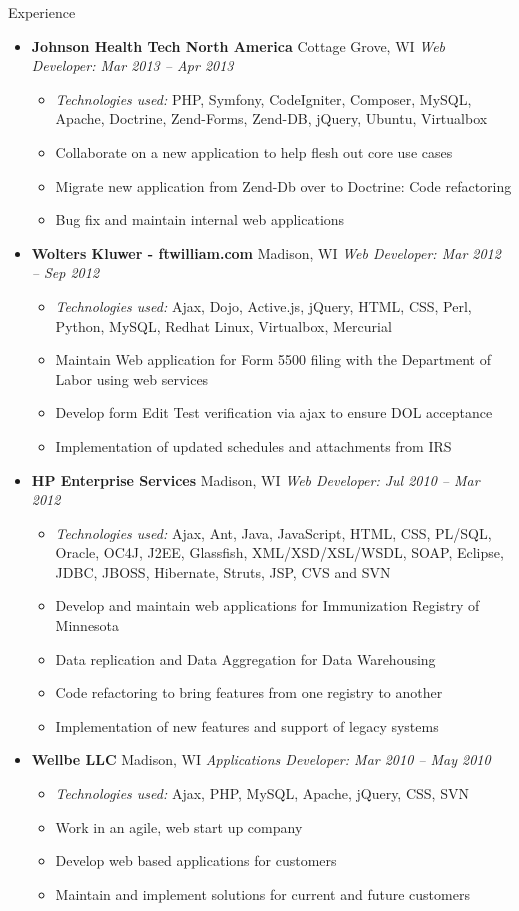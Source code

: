\documentclass[11pt,oneside]{article}
\newenvironment{ressection}[1]{
    \vspace{4pt}
    {\fontfamily{phv}\selectfont\Large#1}
    \begin{itemize}
    \vspace{3pt}
}{
    \end{itemize}
}
\newcommand{\ressubitem}[1]{
    \vspace{-1pt}
    \item \begin{flushleft} #1 \end{flushleft}
}
\newcommand{\resbigitem}[3]{
    \vspace{-5pt}
    \item
    \textbf{#1} #2 \textit{#3}
}
\newenvironment{ressubsec}[3]{
    \resbigitem{#1}{#2}{#3}
    \vspace{-2pt}
    \begin{itemize}
}{
    \end{itemize}
}
\begin{document}
\begin{ressection}{Experience}
    \begin{ressubsec}{Johnson Health Tech North America}{Cottage Grove, WI}{Web Developer: Mar 2013 -- Apr 2013}
        \ressubitem{\textit{Technologies used:} PHP, Symfony, CodeIgniter, Composer, MySQL, Apache, Doctrine, Zend-Forms, Zend-DB, jQuery, Ubuntu, Virtualbox }
        \ressubitem{Collaborate on a new application to help flesh out core use cases }
        \ressubitem{Migrate new application from Zend-Db over to Doctrine: Code refactoring}
        \ressubitem{Bug fix and maintain internal web applications}
    \end{ressubsec}

    \begin{ressubsec}{Wolters Kluwer - ftwilliam.com}{Madison, WI}{Web Developer: Mar 2012 -- Sep 2012}
        \ressubitem{\textit{Technologies used:} Ajax, Dojo, Active.js, jQuery, HTML, CSS, Perl, Python, MySQL, Redhat Linux, Virtualbox, Mercurial}
        \ressubitem{Maintain Web application for Form 5500 filing with the Department of Labor using web services}
        \ressubitem{Develop form Edit Test verification via ajax to ensure DOL acceptance}
        \ressubitem{Implementation of updated schedules and attachments from IRS}
    \end{ressubsec}

    \begin{ressubsec}{HP Enterprise Services}{Madison, WI}{Web Developer: Jul 2010 -- Mar 2012}
        \ressubitem{\textit{Technologies used:} Ajax, Ant, Java, JavaScript, HTML, CSS, PL/SQL, Oracle, OC4J, J2EE, Glassfish, XML/XSD/XSL/WSDL, SOAP, Eclipse, JDBC, JBOSS, Hibernate, Struts, JSP, CVS and SVN}
        \ressubitem{Develop and maintain web applications for Immunization Registry of Minnesota}
        \ressubitem{Data replication and Data Aggregation for Data Warehousing}
        \ressubitem{Code refactoring to bring features from one registry to another}
        \ressubitem{Implementation of new features and support of legacy systems}
    \end{ressubsec}
    \pagebreak
    \begin{ressubsec}{Wellbe LLC}{Madison, WI}{Applications Developer: Mar 2010 -- May 2010}
        \ressubitem{\textit{Technologies used:} Ajax, PHP, MySQL, Apache, jQuery, CSS, SVN}
        \ressubitem{Work in an agile, web start up company}
        \ressubitem{Develop web based applications for customers}
        \ressubitem{Maintain and implement solutions for current and future customers}
    \end{ressubsec}


\end{ressection}
\end{document}
